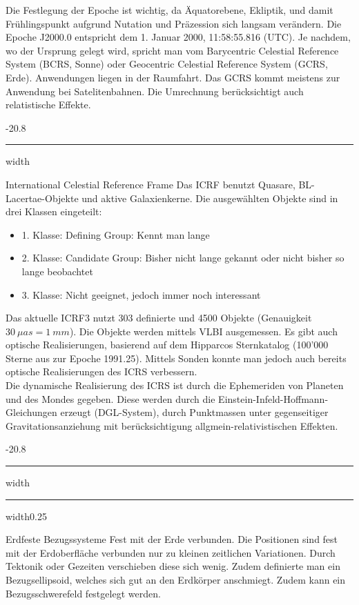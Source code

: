 \documentclass[9pt, landscape, fleqn]{scrartcl}
\makeatletter
\renewcommand{\subsection}{\@startsection{subsection}{1}{0mm}%
{-2\baselineskip}{0.8\baselineskip}%
{\hrule depth 0.2pt width\columnwidth\hrule depth0.75pt
width0.25\columnwidth\vspace*{1.2em}\large\bfseries\rmfamily}}
\renewcommand{\subsubsection}{\@startsection{subsubsection}{1}{0mm}%
{-2\baselineskip}{0.8\baselineskip}%
{\hrule depth 0.2pt width\columnwidth\vspace*{1.2em}\normalsize\bfseries\rmfamily}}
\makeatother
\begin{document}
\begin{multicols*}{3}
Die Festlegung der Epoche ist wichtig, da Äquatorebene, Ekliptik, und damit Frühlingspunkt aufgrund Nutation und Präzession sich langsam verändern.
Die Epoche J2000.0 entspricht dem 1. Januar 2000, 11:58:55.816 (UTC). Je nachdem, wo der Ursprung gelegt wird, spricht man vom Barycentric Celestial Reference System (BCRS, Sonne) oder Geocentric Celestial Reference System (GCRS, Erde). Anwendungen liegen in der Raumfahrt. Das GCRS kommt meistens zur Anwendung bei Satelitenbahnen.
Die Umrechnung berücksichtigt auch relatistische Effekte.

\subsubsection{International Celestial Reference Frame}
Das ICRF benutzt Quasare, BL-Lacertae-Objekte und aktive Galaxienkerne. Die ausgewählten Objekte sind in drei Klassen eingeteilt:
\begin{itemize}
    \item 1. Klasse: Defining Group: Kennt man lange
    \item 2. Klasse: Candidate Group: Bisher nicht lange gekannt oder nicht bisher so lange beobachtet
    \item 3. Klasse: Nicht geeignet, jedoch immer noch interessant
\end{itemize}

Das aktuelle ICRF3 nutzt 303 definierte und 4500 Objekte (Genauigkeit $30~\mu as = 1~mm$). Die Objekte werden mittels VLBI ausgemessen. Es gibt auch optische Realisierungen, basierend auf dem Hipparcos Sternkatalog (100'000 Sterne aus zur Epoche 1991.25). Mittels Sonden konnte man jedoch auch bereits optische Realisierungen des ICRS verbessern. \\

Die dynamische Realisierung des ICRS ist durch die Ephemeriden von Planeten und des Mondes gegeben. Diese werden durch die Einstein-Infeld-Hoffmann-Gleichungen erzeugt (DGL-System), durch Punktmassen unter gegenseitiger Gravitationsanziehung mit berücksichtigung allgmein-relativistischen Effekten.

\subsection{Erdfeste Bezugssysteme}
Fest mit der Erde verbunden. Die Positionen sind fest mit der Erdoberfläche verbunden nur zu kleinen zeitlichen Variationen. Durch Tektonik oder Gezeiten verschieben diese sich wenig. Zudem definierte man ein Bezugsellipsoid, welches sich gut an den Erdkörper anschmiegt. Zudem kann ein Bezugsschwerefeld festgelegt werden.


\end{multicols*}
\end{document}
